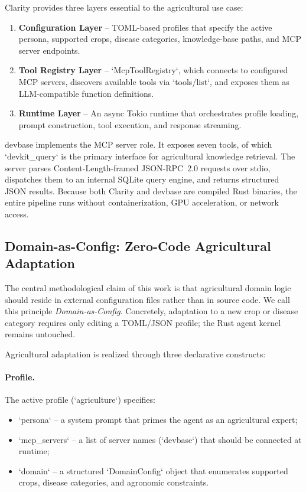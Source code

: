 Clarity provides three layers essential to the agricultural use case:
\begin{enumerate}[leftmargin=*]
    \item \textbf{Configuration Layer} -- TOML-based profiles that specify the active persona, supported crops, disease categories, knowledge-base paths, and MCP server endpoints.
    \item \textbf{Tool Registry Layer} -- `McpToolRegistry`, which connects to configured MCP servers, discovers available tools via `tools/list`, and exposes them as LLM-compatible function definitions.
    \item \textbf{Runtime Layer} -- An async Tokio runtime that orchestrates profile loading, prompt construction, tool execution, and response streaming.
\end{enumerate}

devbase implements the MCP server role. It exposes seven tools, of which `devkit\_query` is the primary interface for agricultural knowledge retrieval. The server parses Content-Length-framed JSON-RPC~2.0 requests over stdio, dispatches them to an internal SQLite query engine, and returns structured JSON results. Because both Clarity and devbase are compiled Rust binaries, the entire pipeline runs without containerization, GPU acceleration, or network access.

\subsection{Domain-as-Config: Zero-Code Agricultural Adaptation}

The central methodological claim of this work is that agricultural domain logic should reside in external configuration files rather than in source code. We call this principle \textit{Domain-as-Config}. Concretely, adaptation to a new crop or disease category requires only editing a TOML/JSON profile; the Rust agent kernel remains untouched.

Agricultural adaptation is realized through three declarative constructs:

\paragraph{Profile.} The active profile (`agriculture`) specifies:
\begin{itemize}[leftmargin=*]
    \item `persona` -- a system prompt that primes the agent as an agricultural expert;
    \item `mcp\_servers` -- a list of server names (`devbase`) that should be connected at runtime;
    \item `domain` -- a structured `DomainConfig` object that enumerates supported crops, disease categories, and agronomic constraints.
\end{itemize}

